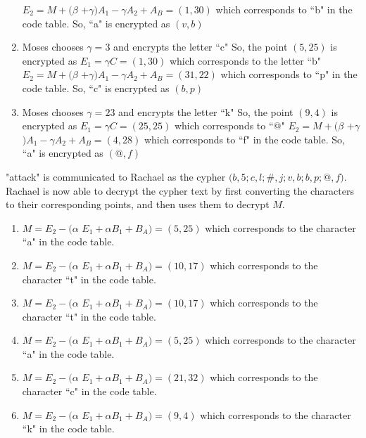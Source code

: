 \begin{example}{26}
\begin{enumerate}[(1)]
	$E_2 = M +($$\beta$ $+$$\gamma$$)$$A_1 -$$\gamma$$A_2 + A_B = (1, 30)$ which corresponds to ``b" in the code table.  So, ``a" is encrypted as $(v, b)$
\item Moses chooses $\gamma$$ = 3$ and encrypts the letter ``c" \newline
	So, the point $(5, 25)$ is encrypted as\newline
	$E_1 = $$\gamma$$C = (1, 30)$ which corresponds to the letter ``b"\newline
	$E_2 = M +($$\beta$ $+$$\gamma$$)$$A_1 -$$\gamma$$A_2 + A_B = (31, 22)$ which corresponds to ``p" in the code table.  So, ``c" is encrypted as $(b, p)$
\item Moses chooses $\gamma$$ = 23$ and encrypts the letter ``k" \newline
	So, the point $(9, 4)$ is encrypted as\newline
	$E_1 = $$\gamma$$C = (25, 25)$ which corresponds to ``@"\newline
	$E_2 = M +($$\beta$ $+$$\gamma$$)$$A_1 -$$\gamma$$A_2 + A_B = (4, 28)$ which corresponds to ``f" in the code table.  So, ``a" is encrypted as $(@, f)$
\end{enumerate}
\begin{flushleft}
"attack" is communicated to Rachael as the cypher $(b,5; c,l; $$\#$$,j; v,b; b,p; @,f)$. Rachael is now able to decrypt the cypher text by first converting the characters to their corresponding points, and then uses them to decrypt $M$.
\end{flushleft}
\begin{enumerate}[(1)]
\item $M = E_2 - ($$\alpha$ $E_1 +$$\alpha$$B_1 +B_A) = (5, 25)$ which corresponds to the character ``a" in the code table.\newline
\item $M = E_2 - ($$\alpha$ $E_1 +$$\alpha$$B_1 +B_A) = (10, 17)$ which corresponds to the character ``t" in the code table.\newline
\item $M = E_2 - ($$\alpha$ $E_1 +$$\alpha$$B_1 +B_A) = (10, 17)$ which corresponds to the character ``t" in the code table.\newline
\item $M = E_2 - ($$\alpha$ $E_1 +$$\alpha$$B_1 +B_A) = (5, 25)$ which corresponds to the character ``a" in the code table.\newline
\item $M = E_2 - ($$\alpha$ $E_1 +$$\alpha$$B_1 +B_A) = (21, 32)$ which corresponds to the character ``c" in the code table.\newline
\item $M = E_2 - ($$\alpha$ $E_1 +$$\alpha$$B_1 +B_A) = (9, 4)$ which corresponds to the character ``k" in the code table.
\end{enumerate}\end{example} 
